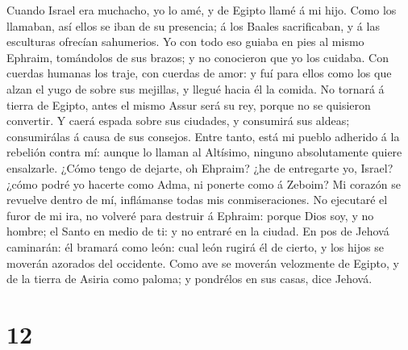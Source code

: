  Cuando Israel era muchacho, yo lo amé, y de Egipto llamé
á mi hijo.  Como los llamaban, así ellos se iban de su
presencia; á los Baales sacrificaban, y á las esculturas ofrecían
sahumerios.  Yo con todo eso guiaba en pies al mismo
Ephraim, tomándolos de sus brazos; y no conocieron que yo los cuidaba.
 Con cuerdas humanas los traje, con cuerdas de amor: y fuí
para ellos como los que alzan el yugo de sobre sus mejillas, y llegué
hacia él la comida.  No tornará á tierra de Egipto, antes
el mismo Assur será su rey, porque no se quisieron convertir.
 Y caerá espada sobre sus ciudades, y consumirá sus
aldeas; consumirálas á causa de sus consejos.  Entre
tanto, está mi pueblo adherido á la rebelión contra mí: aunque lo llaman
al Altísimo, ninguno absolutamente quiere ensalzarle. 
¿Cómo tengo de dejarte, oh Ehpraim? ¿he de entregarte yo, Israel? ¿cómo
podré yo hacerte como Adma, ni ponerte como á Zeboim? Mi corazón se
revuelve dentro de mí, inflámanse todas mis conmiseraciones.
 No ejecutaré el furor de mi ira, no volveré para destruir
á Ephraim: porque Dios soy, y no hombre; el Santo en medio de ti: y no
entraré en la ciudad.  En pos de Jehová caminarán: él
bramará como león: cual león rugirá él de cierto, y los hijos se moverán
azorados del occidente.  Como ave se moverán velozmente
de Egipto, y de la tierra de Asiria como paloma; y pondrélos en sus
casas, dice Jehová. 

\hypertarget{section-11}{%
\section{12}\label{section-11}}


